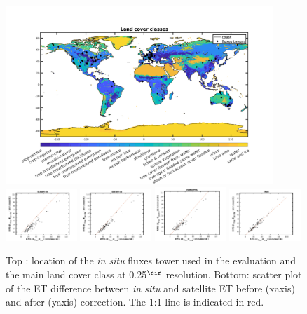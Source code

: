 \documentclass[draft]{agujournal2019}
\begin{document}
\begin{figure}[h]
\centering
\includegraphics[width=0.9\textwidth]{LCC_025.png}
\includegraphics[width=0.24\textwidth]{squatter_rmse1.png}
\includegraphics[width=0.24\textwidth]{squatter_rmse2.png}
\includegraphics[width=0.24\textwidth]{squatter_rmse3.png}
\includegraphics[width=0.24\textwidth]{squatter_rmse4.png}
\caption{Top : location of the {\it in situ} fluxes tower used in the evaluation and the main land cover class at 0.25$^\cir$ resolution. Bottom: scatter plot of the ET difference between {\it in situ} and satellite ET before (xaxis) and after (yaxis) correction. The 1:1 line is indicated in red.}
\end{figure}
\end{document}

